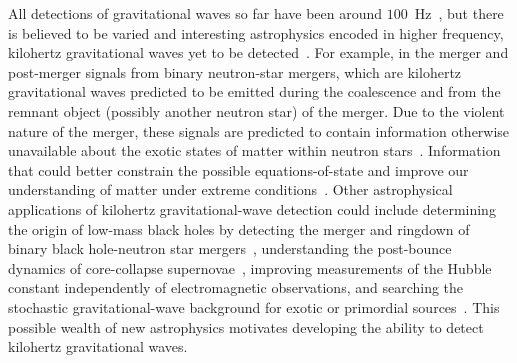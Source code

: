 All detections of gravitational waves so far have been around $100$~Hz~\cite{}, but there is believed to be varied and interesting astrophysics encoded in higher frequency, kilohertz gravitational waves yet to be detected~\cite{}.
For example, in the merger and post-merger signals from binary neutron-star mergers, which are kilohertz gravitational waves predicted to be emitted during the coalescence and from the remnant object (possibly another neutron star) of the merger. 
Due to the violent nature of the merger, these signals are predicted to contain information otherwise unavailable about the exotic states of matter within neutron stars~\cite{}. Information that could better constrain the possible equations-of-state and improve our understanding of matter under extreme conditions~\cite{miaoDesignGravitationalWaveDetectors2018,}. %
Other astrophysical applications of kilohertz gravitational-wave detection could include determining the origin of low-mass black holes by detecting the merger and ringdown of binary black hole-neutron star mergers~\cite{}, understanding the post-bounce dynamics of core-collapse supernovae~\cite{}, improving measurements of the Hubble constant independently of electromagnetic observations, and searching the stochastic gravitational-wave background for exotic or primordial sources~\cite{miaoDesignGravitationalWaveDetectors2018}.
This possible wealth of new astrophysics motivates developing the ability to detect kilohertz gravitational waves.



